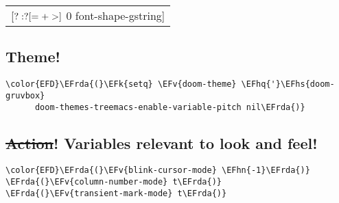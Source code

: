 \documentclass{article}
\newcommand{\EFk}[1]{\textcolor{EFk}{#1}} %
\newcommand{\EFv}[1]{\textcolor{EFv}{#1}} %
\newcommand{\EFhn}[1]{\textcolor{EFhn}{\textbf{#1}}} %
\newcommand{\EFhq}[1]{#1} %
\newcommand{\EFhs}[1]{\textcolor{EFhs}{#1}} %
\newcommand{\EFrda}[1]{\textcolor{EFrda}{#1}} %
\begin{document}
\begin{center}
\begin{tabular}{l}
[\(?:\*?[=+>]\) 0 font-shape-gstring]\\[0pt]
\end{tabular}
\end{center}

\subsection{Theme!}
\label{sec:orgb7452d6}
\begin{Code}
\begin{Verbatim}
\color{EFD}\EFrda{(}\EFk{setq} \EFv{doom-theme} \EFhq{'}\EFhs{doom-gruvbox}
      doom-themes-treemacs-enable-variable-pitch nil\EFrda{)}
\end{Verbatim}
\end{Code}

\subsection{\sout{Action}! Variables relevant to look and feel!}
\label{sec:org8f7f0bc}
\begin{Code}
\begin{Verbatim}
\color{EFD}\EFrda{(}\EFv{blink-cursor-mode} \EFhn{-1}\EFrda{)}
\EFrda{(}\EFv{column-number-mode} t\EFrda{)}
\EFrda{(}\EFv{transient-mark-mode} t\EFrda{)}
\end{Verbatim}
\end{Code}
\end{document}
